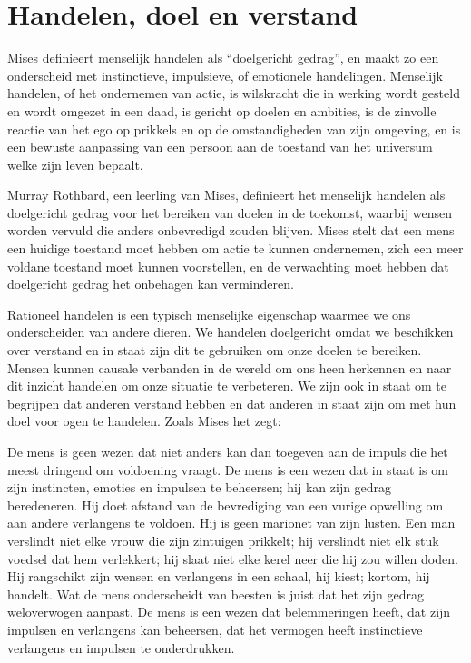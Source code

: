 \section{Handelen, doel en verstand}

Mises definieert menselijk handelen als ``doelgericht gedrag'', en maakt zo een onderscheid met instinctieve, impulsieve, of emotionele handelingen.\autocite{2} Menselijk handelen, of het ondernemen van actie, is wilskracht die in werking wordt gesteld en wordt omgezet in een daad, is gericht op doelen en ambities, is de zinvolle reactie van het ego op prikkels en op de omstandigheden van zijn omgeving, en is een bewuste aanpassing van een persoon aan de toestand van het universum welke zijn leven bepaalt.

Murray Rothbard, een leerling van Mises, definieert het menselijk handelen als doelgericht gedrag voor het bereiken van doelen in de toekomst, waarbij wensen worden vervuld die anders onbevredigd zouden blijven.\autocite{3} Mises stelt dat een mens een huidige toestand moet hebben om actie te kunnen ondernemen, zich een meer voldane toestand moet kunnen voorstellen, en de verwachting moet hebben dat doelgericht gedrag het onbehagen kan verminderen.\autocite{4}

Rationeel handelen is een typisch menselijke eigenschap waarmee we ons onderscheiden van andere dieren. We handelen doelgericht omdat we beschikken over verstand en in staat zijn dit te gebruiken om onze doelen te bereiken. Mensen kunnen causale verbanden in de wereld om ons heen herkennen en naar dit inzicht handelen om onze situatie te verbeteren. We zijn ook in staat om te begrijpen dat anderen verstand hebben en dat anderen in staat zijn om met hun doel voor ogen te handelen. Zoals Mises het zegt:

\begin{blockquotebox}De mens is geen wezen dat niet anders kan dan toegeven aan de impuls die het meest dringend om voldoening vraagt. De mens is een wezen dat in staat is om zijn instincten, emoties en impulsen te beheersen; hij kan zijn gedrag beredeneren. Hij doet afstand van de bevrediging van een vurige opwelling om aan andere verlangens te voldoen. Hij is geen marionet van zijn lusten. Een man verslindt niet elke vrouw die zijn zintuigen prikkelt; hij verslindt niet elk stuk voedsel dat hem verlekkert; hij slaat niet elke kerel neer die hij zou willen doden. Hij rangschikt zijn wensen en verlangens in een schaal, hij kiest; kortom, hij handelt. Wat de mens onderscheidt van beesten is juist dat het zijn gedrag weloverwogen aanpast. De mens is een wezen dat belemmeringen heeft, dat zijn impulsen en verlangens kan beheersen, dat het vermogen heeft instinctieve verlangens en impulsen te onderdrukken.\footnotemark 
\end{blockquotebox}

